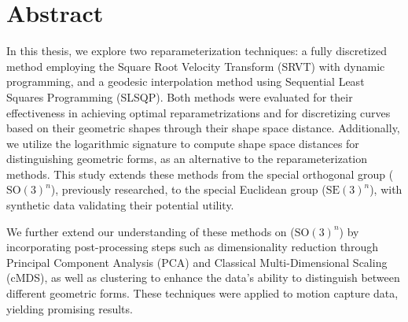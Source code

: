 \chapter*{Abstract}

In this thesis, we explore two reparameterization techniques: a fully discretized method employing the Square Root Velocity Transform (SRVT) with dynamic programming, and a geodesic interpolation method using Sequential Least Squares Programming (SLSQP). Both methods were evaluated for their effectiveness in achieving optimal reparametrizations and for discretizing curves based on their geometric shapes through their shape space distance. Additionally, we utilize the logarithmic signature to compute shape space distances for distinguishing geometric forms, as an alternative to the reparameterization methods. This study extends these methods from the special orthogonal group (\(\mathrm{SO}(3)^n\)), previously researched, to the special Euclidean group (\(\mathrm{SE}(3)^n\)), with synthetic data validating their potential utility.

We further extend our understanding of these methods on (\(\mathrm{SO}(3)^n\)) by incorporating post-processing steps such as dimensionality reduction through Principal Component Analysis (PCA) and Classical Multi-Dimensional Scaling (cMDS), as well as clustering to enhance the data's ability to distinguish between different geometric forms. These techniques were applied to motion capture data, yielding promising results.